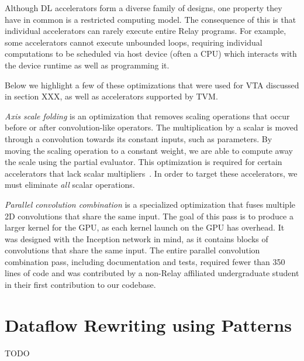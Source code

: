 Although DL accelerators form a diverse family of designs,
  one property they have in common is a restricted computing model.
The consequence of this is that individual accelerators
  can rarely execute entire Relay programs.
For example, some accelerators cannot execute unbounded loops,
  requiring individual computations to be scheduled via
  host device (often a CPU) which interacts with the device runtime
  as well as programming it.

Below we highlight a few of these optimizations that were used for
VTA discussed in section XXX, as well as accelerators supported by
TVM.

\textit{Axis scale folding} is an optimization that removes scaling
  operations that occur before or after convolution-like operators.
The multiplication by a scalar is moved through a convolution towards
  its constant inputs, such as parameters.
By moving the scaling operation to a constant weight, we are able
  to compute away the scale using the partial evaluator.
This optimization is required for certain accelerators that lack scalar multipliers~\citep{moreau2018vta}.
In order to target these accelerators,
  we must eliminate \textit{all} scalar operations.

\textit{Parallel convolution combination} is a specialized
  optimization that fuses multiple 2D convolutions that share the same input.
The goal of this pass is to produce a larger kernel for the GPU,
  as each kernel launch on the GPU has overhead.
It was designed with the Inception network \citep{inception} in mind, as it
  contains blocks of convolutions that share the same input.
The entire parallel convolution combination pass,
  including documentation and tests,
  required fewer than 350 lines of code and was contributed
  by a non-Relay affiliated undergraduate student
  in their first contribution to our codebase.

\section{Dataflow Rewriting using Patterns}
TODO
